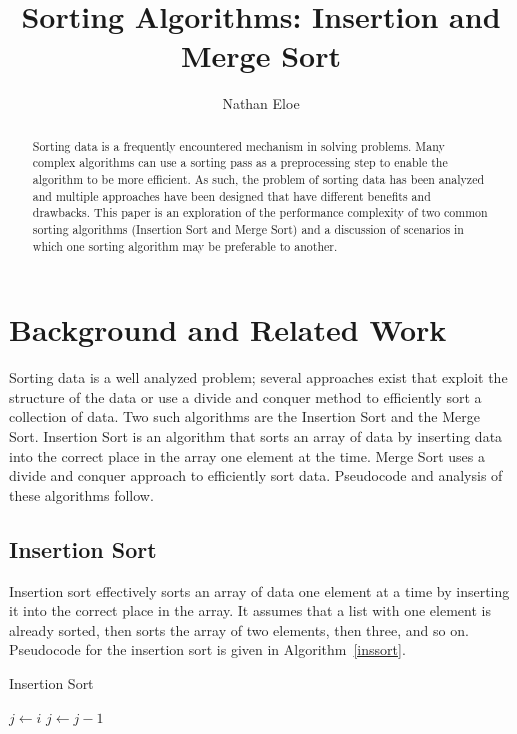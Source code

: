 \documentclass[10pt, letterpaper]{article}
\title{Sorting Algorithms: Insertion and Merge Sort}
\author{Nathan Eloe}
\begin{document}
	\maketitle
	\begin{abstract}
		Sorting data is a frequently encountered mechanism in solving problems.  Many complex algorithms can use a sorting pass as a preprocessing step to enable the algorithm to be more efficient.  As such, the problem of sorting data has been analyzed and multiple approaches have been designed that have different benefits and drawbacks.  This paper is an exploration of the performance complexity of two common sorting algorithms (Insertion Sort and Merge Sort) and a discussion of scenarios in which one sorting algorithm may be preferable to another.
	\end{abstract}
	\section{Background and Related Work}
	Sorting data is a well analyzed problem;  several approaches exist that exploit the structure of the data or use a divide and conquer method to efficiently sort a collection of data.  Two such algorithms are the Insertion Sort and the Merge Sort.  Insertion Sort is an algorithm that sorts an array of data by inserting data into the correct place in the array one element at the time.  Merge Sort uses a divide and conquer approach to efficiently sort data.  Pseudocode and analysis of these algorithms follow.
	
	\subsection{Insertion Sort}
	Insertion sort effectively sorts an array of data one element at a time by inserting it into the correct place in the array.  It assumes that a list with one element is already sorted, then sorts the array of two elements, then three, and so on.  Pseudocode for the insertion sort is given in Algorithm~\ref{inssort}. 
	\begin{algorithm}
	\begin{algorithmic}
		\caption{Insertion Sort}\label{inssort}
	\State $j\gets i$
	\State $j\gets j-1$
	\EndWhile
	\EndFor
	\EndFunction
	\end{algorithmic}
	\end{algorithm}
	
\end{document}
